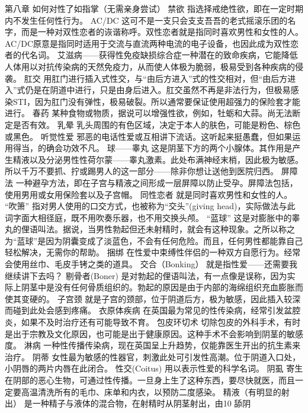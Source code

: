 \documentclass[12pt,UTF8]{ctexbook}
\begin{document}
第八章 如何对性了如指掌（无需亲身尝试）
禁欲
指选择戒绝性欲，即在一定时期内不发生任何性行为。
AC/DC
这可不是一支只会支支吾吾的老式摇滚乐团的名字，而是一种对双性恋者的诙谐称呼。双性恋者就是指同时喜欢男性和女性的人。AC/DC原意是指同时适用于交流与直流两种电流的电子设备，也因此成为双性恋者的代名词。
艾滋病——获得性免疫缺损综合症一种潜在的致命疾病，它能降低人体用以对抗传染病的天然免疫力，从而使人体极为脆弱，极易受到各种疾病的侵袭。
肛交
用肛门进行插入式性交，与“由后方进入”式的性交相对，但“由后方进入”式仍是在阴道中进行，只是由身后进入。肛交虽然不再是非法行为，但极易感染STI，因为肛门没有弹性，极易破裂。所以通常要保证使用超强力的保险套才能进行。
春药
某种食物或物质，据说可以增强性欲，例如，牡蛎和大蒜。尚无法断定是否有效。
乳晕
乳头周围的有色区域，决定于本人的肤色，可能是粉色、棕色或黑色。
听觉性爱
邪恶的电话性爱或互相讲下流话。这听起来挺愚蠢，但如果运用得当，的确会功效不凡。
球——睾丸
这是阴茎下方的两个小腺体。其作用是产生精液以及分泌男性性荷尔蒙——睾丸激素。此处布满神经末梢，因此极为敏感。所以千万不要抓、拧或踢男人的这一部分——除非你想让送他到医院归西。
屏障法
一种避孕方法，即在子宫与精液之间形成一层屏障以防止受孕。屏障法包括，使用男用或女用保险套以及子宫帽。
同性恋者
就是同时喜欢男性和女性的人。
“吹箫”
指对男人使用的口交方式，也被称为“交头”(giving head)，实际做法与此词字面大相径庭，既不用吹奏乐器，也不用交换头颅。
“蓝球”
这是对膨胀中的睾丸的俚语叫法。据说，当男性勃起但还未射精时，就会有这种现象。之所以称之为“蓝球”是因为阴囊变成了淡蓝色，不会有任何危险。而且，任何男性都能靠自己轻松解决，无需你的帮助。
捆绑
在性爱中束缚性伴侣的一种双方自愿行为。经常会使用丝巾、毛皮手铐之类的道具。
交合（Bonking）
就是指性爱——还需要我继续讲下去吗？
剔骨者(Boner)
是对勃起的俚语叫法，有一点像是误称，因为实际上阴茎中是没有任何骨质组织的。勃起的原因是由于内部的海绵组织充血膨胀而使其变硬的。
子宫颈
就是子宫的颈部，位于阴道后方，极为敏感，因此插入较深而碰到此处会感到疼痛。
衣原体疾病
在英国最为常见的性传染病，经常引发盆腔炎，如果不及时治疗还有可能导致不育。
包皮环切术
切除包皮的外科手术，有时是出于宗教及文化原因，也可能是出于健康原因。这种手术不会影响到阴茎的敏感度。
淋病
一种性传播传染病，现在英国呈上升趋势，仅能靠医生开出的抗生素来治疗。
阴蒂
女性最为敏感的性器官，刺激此处可引发性高潮。位于阴道入口处，小阴唇的两片内唇在此闭合。
性交(Coitus)
用以表示性爱的科学名词。
阴虱
寄生在阴部的恶心生物，可通过性传播。一旦身上生了这种东西，要尽快就医，而且一定要高温清洗所有的毛巾、床单和内衣，以预防二度感染。
精液（有明显的射出）
是一种精子与液体的混合物，在射精时从阴茎射出，由10%
舔阴
\end{document}
